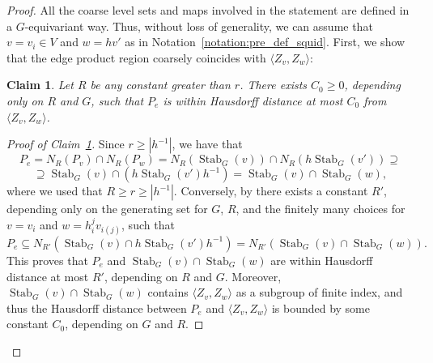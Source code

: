\documentclass[svgnames]{amsart}
\theoremstyle{plain}
\newtheorem{claim}[thm]{Claim}
\theoremstyle{definition}
\newenvironment{claimproof}{\renewcommand{\qedsymbol}{$\blacksquare$}\begin{proof}}{\end{proof}}
\newcommand{\Stab}[2]{\operatorname{Stab}_{#1}(#2)}
\begin{document}
\begin{proof}
All the coarse level sets and maps involved in the statement are defined in a $G$-equivariant way. Thus, without loss of generality, we can assume that $v=v_i\in V$ and $w=h v'$ as in Notation~\ref{notation:pre_def_squid}. First, we show that the edge product region coarsely coincides with $\langle Z_v, Z_w\rangle$:


\begin{claim}\label{claim:Pe_coarsely_square} Let $R$ be any constant greater than $r$. There exists $C_0\ge 0$, depending only on $R$ and $G$, such that $P_e$ is within Hausdorff distance at most $C_0$ from $\langle Z_v, Z_w\rangle$.
\end{claim}

\begin{claimproof}[Proof of Claim~\ref{claim:Pe_coarsely_square}]
Since $r\ge |h^{-1}|$, we have that 
$$P_e=N_R(P_v)\cap N_R(P_w)=N_R\left(\Stab{G}{v}\right)\cap N_R\left(h\Stab{G}{v'}\right) \supseteq $$
$$\supseteq\Stab{G}{v}\cap \left(h\Stab{G}{v'} h^{-1}\right)=\Stab{G}{v}\cap \Stab{G}{w},$$
where we used that $R\ge r\ge |h^{-1}|$. Conversely, by \cite[Lemma 4.5]{Hruska_Wise} there exists a constant $R'$, depending only on the generating set for $G$, $R$, and the finitely many choices for $v=v_i$ and $w=h_i^jv_{i(j)}$, such that 
$$P_e\subseteq N_{R'}\left(\Stab{G}{v}\cap h\Stab{G}{v'}h^{-1}\right)=N_{R'}\left(\Stab{G}{v}\cap \Stab{G}{w}\right).$$
This proves that $P_e$ and  $\Stab{G}{v}\cap \Stab{G}{w}$ are within Hausdorff distance at most $R'$, depending on $R$ and $G$. Moreover, $\Stab{G}{v}\cap \Stab{G}{w}$ contains $\langle Z_v,Z_w\rangle$ as a subgroup of finite index, and thus the Hausdorff distance between $P_e$ and $\langle Z_v,Z_w\rangle$ is bounded by some constant $C_0$, depending on $G$ and $R$.
\end{claimproof}


\end{proof}
\end{document}
